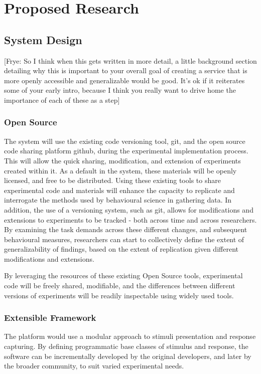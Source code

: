 \documentclass[12pt,a4paper,titlepage]{scrreprt}
\begin{document}
\chapter{Proposed Research}
\section{System Design}
[Frye: So I think when this gets written in more detail, a little background section detailing why this is important to your overall goal of creating a service that is more openly accessible and generalizable would be good. It's ok if it reiterates some of your early intro, because I think you really want to drive home the importance of each of these as a step]
\subsection{Open Source}

The system will use the existing code versioning tool, git\cite{_git_????}, and the open source code sharing platform github\cite{_github_????}, during the experimental implementation process. This will allow the quick sharing, modification, and extension of experiments created within it. As a default in the system, these materials will be openly licensed, and free to be distributed. Using these existing tools to share experimental code and materials will enhance the capacity to replicate and interrogate the methods used by behavioural science in gathering data\cite{giner-sorolla_science_2012,nosek_scientific_2012,miguel_promoting_2014}. In addition, the use of a versioning system, such as git, allows for modifications and extensions to experiments to be tracked - both across time and across researchers. By examining the task demands across these different changes, and subsequent behavioural measures, researchers can start to collectively define the extent of generalizability of findings, based on the extent of replication given different modifications and extensions.

By leveraging the resources of these existing Open Source tools, experimental code will be freely shared, modifiable, and the differences between different versions of experiments will be readily inspectable using widely used tools.
\subsection{Extensible Framework}
The platform would use a modular approach to stimuli presentation and response capturing. By defining programmatic base classes of stimulus and response, the software can be incrementally developed by the original developers, and later by the broader community, to suit varied experimental needs. 
\end{document}

